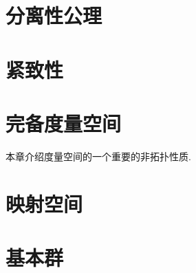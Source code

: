 \chapter{分离性公理}

\chapter{紧致性}

\chapter{完备度量空间}
本章介绍度量空间的一个重要的非拓扑性质.




\chapter{映射空间}


\chapter{基本群}

\endgroup
